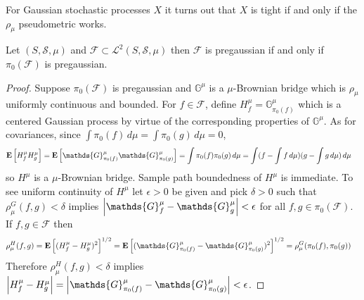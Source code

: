 For Gaussian stochastic processes $X$ it turns out that $X$ is tight if and only if the $\rho_\mu$ pseudometric works.

\begin{prop}\label{prop:PregaussianConditions}Let $(S, \mathcal{S}, \mu)$ and $\mathcal{F} \subset \mathcal{L}^2(S, \mathcal{S}, \mu)$ then $\mathcal{F}$ is pregaussian if and only if $\pi_0(\mathcal{F})$ is pregaussian.
\end{prop}
\begin{proof}
Suppose $\pi_0(\mathcal{F})$ is pregaussian and $\mathds{G}^\mu$ is a $\mu$-Brownian bridge which is $\rho_\mu$ uniformly continuous and bounded.  For $f \in \mathcal{F}$, define $H^\mu_f = \mathds{G}^\mu_{\pi_0(f)}$ which is a centered Gaussian process by virtue of the corresponding properties of $\mathds{G}^\mu$.  As for covariances, since $\int \pi_0(f) \, d\mu = \int \pi_0(g) \, d\mu = 0$,
\begin{align*}
\expectation{H^\mu_f H^\mu_g} &= \expectation{\mathds{G}^\mu_{\pi_0(f)}\mathds{G}^\mu_{\pi_0(g)}} = \int \pi_0(f) \pi_0(g) \, d\mu = \int (f - \int f \, d\mu) (g-\int g \, d\mu) \, d\mu
\end{align*}
so $H^\mu$ is a $\mu$-Brownian bridge.  Sample path boundedness of $H^\mu$ is immediate.  To see uniform continuity of $H^\mu$ let $\epsilon>0$ be given and 
pick $\delta > 0$ such that $\rho^G_\mu(f,g) < \delta$ implies $\abs{\mathds{G}^\mu_f - \mathds{G}^\mu_g} < \epsilon$ for all $f,g \in \pi_0(\mathcal{F})$.  If $f,g \in \mathcal{F}$ then
\begin{align*}
\rho^H_\mu(f,g) &= \expectation{(H^\mu_f - H^\mu_g)^2}^{1/2} = \expectation{(\mathds{G}^\mu_{\pi_0(f)} - \mathds{G}^\mu_{\pi_0(g)})^2}^{1/2} = \rho^G_\mu(\pi_0(f), \pi_0(g))
\end{align*}
Therefore $\rho^H_\mu(f,g) < \delta$ implies $\abs{H^\mu_f - H^\mu_g} = \abs{\mathds{G}^\mu_{\pi_0(f)} - \mathds{G}^\mu_{\pi_0(g)}} < \epsilon$.


\end{proof}
